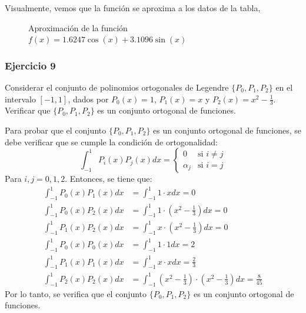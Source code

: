 \documentclass{article}
\begin{document}
Visualmente, vemos que la función se aproxima a los datos de la tabla,
\begin{figure}[h]
    \centering
    \caption{Aproximación de la función \( f(x) = 1.6247 \cos(x) + 3.1096 \sin(x) \)}
    \label{fig:myplot12}
\end{figure}

\subsubsection{Ejercicio 9}
Considerar el conjunto de polinomios ortogonales de Legendre $\{ P_0, P_1, P_2 \}$ en el intervalo $[-1,1]$, dados por $P_0(x) = 1$, $P_1(x) = x$ y $P_2(x) = x^2 - \frac{1}{3}$. Verificar que $\{ P_0, P_1, P_2 \}$ es un conjunto ortogonal de funciones.

Para probar que el conjunto $\{ P_0, P_1, P_2 \}$ es un conjunto ortogonal de funciones, se debe verificar que se cumple la condición de ortogonalidad:
\begin{equation}
    \int_{-1}^{1} P_i(x)P_j(x) dx = 
    \begin{cases}
        0 & \text{si } i \neq j \\
        \alpha_j & \text{si } i = j
    \end{cases}
\end{equation}
Para $i,j = 0,1,2$. Entonces, se tiene que:
\begin{align}
    \int_{-1}^{1} P_0(x)P_1(x) dx &= \int_{-1}^{1} 1 \cdot x dx = 0 \\
    \int_{-1}^{1} P_0(x)P_2(x) dx &= \int_{-1}^{1} 1 \cdot (x^2 - \frac{1}{3}) dx = 0 \\
    \int_{-1}^{1} P_1(x)P_2(x) dx &= \int_{-1}^{1} x \cdot (x^2 - \frac{1}{3}) dx = 0 \\
    \int_{-1}^{1} P_0(x)P_0(x) dx &= \int_{-1}^{1} 1 \cdot 1 dx = 2 \\
    \int_{-1}^{1} P_1(x)P_1(x) dx &= \int_{-1}^{1} x \cdot x dx = \frac{2}{3} \\
    \int_{-1}^{1} P_2(x)P_2(x) dx &= \int_{-1}^{1} (x^2 - \frac{1}{3}) \cdot (x^2 - \frac{1}{3}) dx = \frac{8}{45}
\end{align}
Por lo tanto, se verifica que el conjunto $\{ P_0, P_1, P_2 \}$ es un conjunto ortogonal de funciones.
\end{document}
